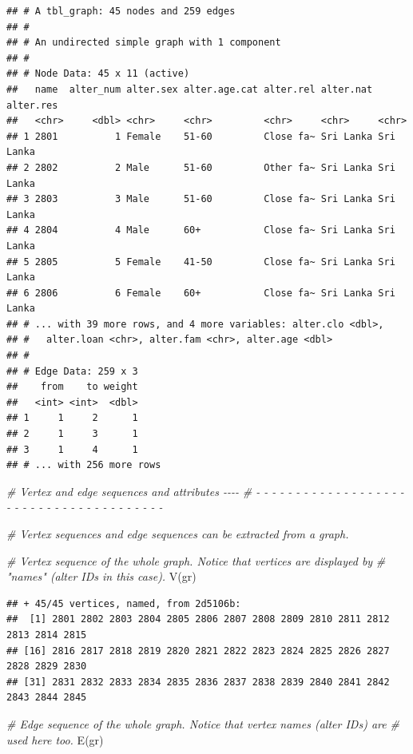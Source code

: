 \documentclass[
]{book}
\newenvironment{Shaded}{\begin{snugshade}}{\end{snugshade}}
\newcommand{\CommentTok}[1]{\textcolor[rgb]{0.56,0.35,0.01}{\textit{#1}}}
\newcommand{\FunctionTok}[1]{\textcolor[rgb]{0.00,0.00,0.00}{#1}}
\newcommand{\NormalTok}[1]{#1}
\begin{document}
\begin{verbatim}
## # A tbl_graph: 45 nodes and 259 edges
## #
## # An undirected simple graph with 1 component
## #
## # Node Data: 45 x 11 (active)
##   name  alter_num alter.sex alter.age.cat alter.rel alter.nat alter.res
##   <chr>     <dbl> <chr>     <chr>         <chr>     <chr>     <chr>    
## 1 2801          1 Female    51-60         Close fa~ Sri Lanka Sri Lanka
## 2 2802          2 Male      51-60         Other fa~ Sri Lanka Sri Lanka
## 3 2803          3 Male      51-60         Close fa~ Sri Lanka Sri Lanka
## 4 2804          4 Male      60+           Close fa~ Sri Lanka Sri Lanka
## 5 2805          5 Female    41-50         Close fa~ Sri Lanka Sri Lanka
## 6 2806          6 Female    60+           Close fa~ Sri Lanka Sri Lanka
## # ... with 39 more rows, and 4 more variables: alter.clo <dbl>,
## #   alter.loan <chr>, alter.fam <chr>, alter.age <dbl>
## #
## # Edge Data: 259 x 3
##    from    to weight
##   <int> <int>  <dbl>
## 1     1     2      1
## 2     1     3      1
## 3     1     4      1
## # ... with 256 more rows
\end{verbatim}

\begin{Shaded}
\begin{Highlighting}[]
\CommentTok{\# Vertex and edge sequences and attributes                                  {-}{-}{-}{-}}
\CommentTok{\# {-} {-} {-} {-} {-} {-} {-} {-} {-} {-} {-} {-} {-} {-} {-} {-} {-} {-} {-} {-} {-} {-} {-} {-} {-} {-} {-} {-} {-} {-} {-} {-} {-} {-} {-} {-} {-} {-} {-} }

\CommentTok{\# Vertex sequences and edge sequences can be extracted from a graph.}

\CommentTok{\# Vertex sequence of the whole graph. Notice that vertices are displayed by}
\CommentTok{\# "names" (alter IDs in this case).}
\FunctionTok{V}\NormalTok{(gr)}
\end{Highlighting}
\end{Shaded}

\begin{verbatim}
## + 45/45 vertices, named, from 2d5106b:
##  [1] 2801 2802 2803 2804 2805 2806 2807 2808 2809 2810 2811 2812 2813 2814 2815
## [16] 2816 2817 2818 2819 2820 2821 2822 2823 2824 2825 2826 2827 2828 2829 2830
## [31] 2831 2832 2833 2834 2835 2836 2837 2838 2839 2840 2841 2842 2843 2844 2845
\end{verbatim}

\begin{Shaded}
\begin{Highlighting}[]
\CommentTok{\# Edge sequence of the whole graph. Notice that vertex names (alter IDs) are}
\CommentTok{\# used here too.}
\FunctionTok{E}\NormalTok{(gr)}
\end{Highlighting}
\end{Shaded}
\end{document}
